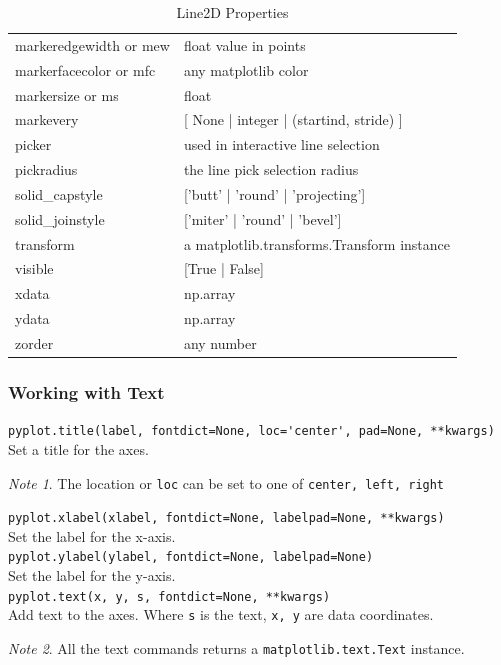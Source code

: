 \documentclass{article}
\theoremstyle{definition}
\theoremstyle{remark}
\newtheorem*{nb}{Note}
\newcommand{\func}[2]{\noindent\lstinline{#1}\\#2}
\begin{document}
\begin{table}[h!]
\begin{tabular}{ p{4cm} p{6cm}}
    markeredgewidth or mew &	float value in points \\
    markerfacecolor or mfc &	any matplotlib color \\
    markersize or ms &	float \\
    markevery 	&	[ None | integer | (startind, stride) ] \\
    picker 		&	used in interactive line selection \\
    pickradius 	&	the line pick selection radius \\
    solid\_capstyle 	&	['butt' | 'round' | 'projecting'] \\
    solid\_joinstyle &	['miter' | 'round' | 'bevel'] \\
    transform 	&	a matplotlib.transforms.Transform instance \\
    visible 	&	[True | False] \\
    xdata 		&	np.array \\
    ydata 		&	np.array \\
    zorder 		&	any number \\
    \hline
    \end{tabular}
\caption{Line2D Properties}
\label{table:line2d_props}
\end{table}


\subsubsection{Working with Text}


\func{pyplot.title(label, fontdict=None, loc='center', pad=None, **kwargs)}{Set a title for the axes.}

\begin{nb}
    The location or \lstinline{loc} can be set to one of \lstinline{center, left, right}\\
\end{nb}

\func{pyplot.xlabel(xlabel, fontdict=None, labelpad=None, **kwargs)}{Set the label for the x-axis.\\}

\func{pyplot.ylabel(ylabel, fontdict=None, labelpad=None)}{Set the label for the y-axis.\\}

\func{pyplot.text(x, y, s, fontdict=None, **kwargs)}{Add text to the axes. Where \lstinline{s} is the text, \lstinline{x, y} are data coordinates.\\}

\begin{nb}
    All the text commands returns a \lstinline{matplotlib.text.Text} instance.
\end{nb}
\end{document}
